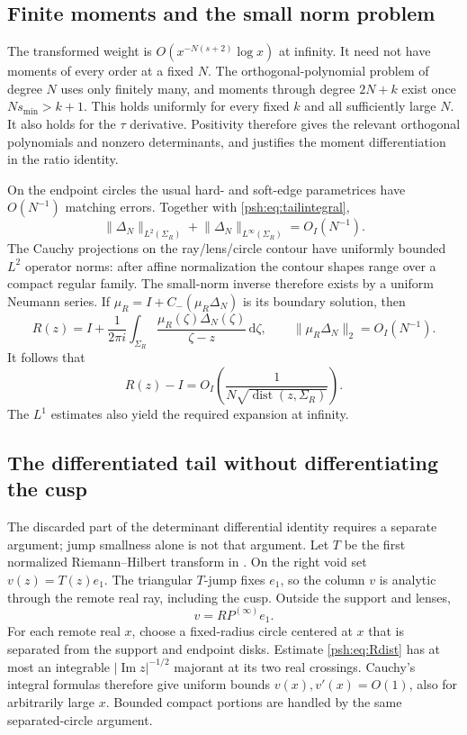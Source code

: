 \documentclass[11pt,a4paper]{article}
\numberwithin{equation}{section}
\theoremstyle{remark}\newtheorem{remark}[theorem]{Remark}
\newcommand{\dd}{\,\mathrm d}
\newcommand{\norm}[1]{\lVert#1\rVert}
\DeclareMathOperator{\dist}{dist}
\begin{document}
\subsection{Finite moments and the small norm problem}
The transformed weight is
$O(x^{-N(s+2)}\log x)$ at infinity. It need not have moments of every
order at a fixed $N$. The orthogonal-polynomial problem of degree $N$
uses only finitely many, and moments through degree $2N+k$ exist once
$Ns_{\min}>k+1$. This holds uniformly for every fixed $k$ and all
sufficiently large $N$. It also holds for the $\tau$ derivative. Positivity
therefore gives the relevant orthogonal polynomials and nonzero
determinants, and justifies the moment differentiation in the ratio
identity.

On the endpoint circles the usual hard- and soft-edge parametrices have
$O(N^{-1})$ matching errors. Together with \eqref{psh:eq:tailintegral},
\[
 \norm{\Delta_N}_{L^2(\Sigma_R)}+
 \norm{\Delta_N}_{L^\infty(\Sigma_R)}=O_I(N^{-1}).
\]
The Cauchy projections on the ray/lens/circle contour have uniformly
bounded $L^2$ operator norms: after affine normalization the contour
shapes range over a compact regular family. The small-norm inverse
therefore exists by a uniform Neumann series. If
$\mu_R=I+C_-(\mu_R\Delta_N)$ is its boundary solution, then
\begin{equation}\label{psh:eq:Rrep}
 R(z)=I+\frac1{2\pi i}\int_{\Sigma_R}
              \frac{\mu_R(\zeta)\Delta_N(\zeta)}{\zeta-z}\dd\zeta,
 \qquad \norm{\mu_R\Delta_N}_2=O_I(N^{-1}).
\end{equation}
It follows that
\begin{equation}\label{psh:eq:Rdist}
 R(z)-I=O_I\!\left(\frac1{N\sqrt{\dist(z,\Sigma_R)}}\right).
\end{equation}
The $L^1$ estimates also yield the required expansion at infinity.

\subsection{The differentiated tail without differentiating the cusp}
The discarded part of the determinant differential identity requires a
separate argument; jump smallness alone is not that argument.
Let $T$ be the first normalized Riemann--Hilbert transform in
\cite[Section 5]{psh-cg}. On the right void set $v(z)=T(z)e_1$.
The triangular $T$-jump fixes $e_1$, so the column $v$ is analytic through
the remote real ray, including the cusp. Outside the support and lenses,
\[
 v=R P^{(\infty)}e_1.
\]
For each remote real $x$, choose a fixed-radius circle centered at $x$
that is separated from the support and endpoint disks. Estimate
\eqref{psh:eq:Rdist} has at most an integrable
$|\operatorname{Im}z|^{-1/2}$ majorant at its two real crossings.
Cauchy's integral formulas therefore give uniform bounds
$v(x),v'(x)=O(1)$, also for arbitrarily large $x$. Bounded compact
portions are handled by the same separated-circle argument.
\end{document}
